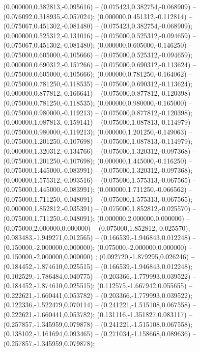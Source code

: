  (0.000000,0.382813,-0.095616) -- (0.075423,0.382754,-0.068909) -- (0.076092,0.318935,-0.057024);
 (0.000000,0.451312,-0.112814) -- (0.075067,0.451302,-0.081480) -- (0.075423,0.382754,-0.068909);
 (0.000000,0.525312,-0.131016) -- (0.075000,0.525312,-0.094659) -- (0.075067,0.451302,-0.081480);
 (0.000000,0.605000,-0.146250) -- (0.075000,0.605000,-0.105666) -- (0.075000,0.525312,-0.094659);
 (0.000000,0.690312,-0.157266) -- (0.075000,0.690312,-0.113624) -- (0.075000,0.605000,-0.105666);
 (0.000000,0.781250,-0.164062) -- (0.075000,0.781250,-0.118535) -- (0.075000,0.690312,-0.113624);
 (0.000000,0.877812,-0.166641) -- (0.075000,0.877812,-0.120398) -- (0.075000,0.781250,-0.118535);
 (0.000000,0.980000,-0.165000) -- (0.075000,0.980000,-0.119213) -- (0.075000,0.877812,-0.120398);
 (0.000000,1.087813,-0.159141) -- (0.075000,1.087813,-0.114979) -- (0.075000,0.980000,-0.119213);
 (0.000000,1.201250,-0.149063) -- (0.075000,1.201250,-0.107698) -- (0.075000,1.087813,-0.114979);
 (0.000000,1.320312,-0.134766) -- (0.075000,1.320312,-0.097368) -- (0.075000,1.201250,-0.107698);
 (0.000000,1.445000,-0.116250) -- (0.075000,1.445000,-0.083991) -- (0.075000,1.320312,-0.097368);
 (0.000000,1.575312,-0.093516) -- (0.075000,1.575313,-0.067565) -- (0.075000,1.445000,-0.083991);
 (0.000000,1.711250,-0.066562) -- (0.075000,1.711250,-0.048091) -- (0.075000,1.575313,-0.067565);
 (0.000000,1.852812,-0.035391) -- (0.075000,1.852812,-0.025570) -- (0.075000,1.711250,-0.048091);
 (0.000000,2.000000,0.000000) -- (0.075000,2.000000,0.000000) -- (0.075000,1.852812,-0.025570);
 (0.083483,-1.949271,0.012565) -- (0.166539,-1.946843,0.012248) -- (0.150000,-2.000000,0.000000);
 (0.075000,-2.000000,0.000000) -- (0.150000,-2.000000,0.000000) ;
 (0.092720,-1.879295,0.026246) -- (0.184452,-1.874610,0.025515) -- (0.166539,-1.946843,0.012248);
 (0.102529,-1.786484,0.040775) -- (0.203366,-1.779993,0.039522) -- (0.184452,-1.874610,0.025515);
 (0.112575,-1.667942,0.055655) -- (0.222621,-1.660441,0.053782) -- (0.203366,-1.779993,0.039522);
 (0.122336,-1.522479,0.070114) -- (0.241221,-1.515108,0.067558) -- (0.222621,-1.660441,0.053782);
 (0.131116,-1.351827,0.083117) -- (0.257857,-1.345959,0.079878) -- (0.241221,-1.515108,0.067558);
 (0.138102,-1.161694,0.093465) -- (0.271034,-1.158668,0.089636) -- (0.257857,-1.345959,0.079878);
